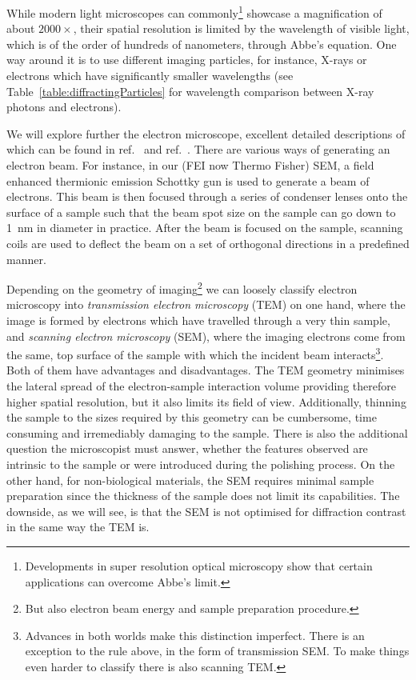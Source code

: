 While modern light microscopes can commonly\footnote{ Developments in super resolution optical microscopy show that certain applications can overcome Abbe's limit.} showcase a magnification of about $2000\times$, their spatial resolution is limited by the wavelength of visible light, which is of the order of hundreds of nanometers, through Abbe's equation. One way around it is to use  different imaging particles, for instance, X-rays or electrons which have significantly smaller wavelengths (see Table~\ref{table:diffractingParticles} for wavelength comparison between X-ray photons and electrons).   

We will explore further the electron microscope, excellent detailed descriptions of which can be found in ref.~\cite{Hearle72} and ref.~\cite{reimerSEM}. There are various ways of generating an electron beam. For instance, in our (FEI now Thermo Fisher) SEM, a field enhanced thermionic emission Schottky gun is used to generate a beam of electrons. This beam is then focused through a series of condenser lenses onto the surface of a sample such that the beam spot size on the sample can go down to  \SI{1}{\nano \meter} in diameter in practice.  After the beam is focused on the sample, scanning coils are used to deflect the beam on a set of orthogonal directions in a predefined manner. 

Depending on the geometry of imaging\footnote{ But also electron beam energy and sample preparation procedure.} we can loosely classify electron microscopy into \textit{transmission electron microscopy} (TEM) on one hand, where the image is formed by electrons which have travelled through a very thin sample, and \textit{scanning electron microscopy} (SEM), where the imaging electrons come from the same, top surface of the sample with which the incident beam interacts\footnote{ Advances in both worlds make this distinction imperfect. There is an exception to the rule above, in the form of transmission SEM. To make things even harder to classify there is also scanning TEM.}. Both of them have advantages and disadvantages. The TEM geometry minimises the lateral spread of the electron-sample interaction volume providing therefore higher spatial resolution, but it also limits its field of view. Additionally, thinning the sample to the sizes required by this geometry can be cumbersome, time consuming and irremediably damaging to the sample. There is also the additional question the microscopist must answer, whether the features observed are intrinsic to the sample or were introduced during the polishing process. On the other hand, for non-biological materials, the SEM requires minimal sample preparation since the thickness of the sample does not limit its capabilities. The downside, as we will see, is that the SEM is not optimised for diffraction contrast in the same way the TEM is. 


